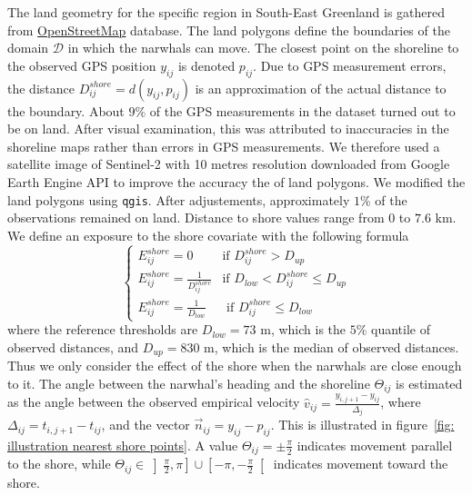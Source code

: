 \documentclass[11pt]{article}
\newcommand {\1}{\mathbb{1}}
\theoremstyle{definition}
\theoremstyle{remark}
\theoremstyle{remark}
\begin{document}
The land geometry for the specific region in South-East Greenland is gathered from \href{https://www.openstreetmap.org/#map=11/70.4029/-27.2928}{OpenStreetMap} database. The land polygons define the boundaries of the domain $\mathcal{D}$ in which the narwhals can move. The closest point on the shoreline to the observed GPS position $y_{ij}$  is denoted $p_{ij}$. Due to GPS measurement errors, the distance $D^{shore}_{ij}=d(y_{ij},p_{ij})$ is an approximation of the actual distance to the boundary. About $9\%$ of the GPS measurements in the dataset turned out to be on land. After visual examination, this was attributed to inaccuracies in the shoreline maps rather than errors in GPS measurements. We therefore used a satellite image of Sentinel-2 with 10 metres resolution downloaded from Google Earth Engine API to improve the accuracy the of land polygons. We modified  the land polygons using \texttt{qgis}. After adjustements,  approximately $1 \%$ of the observations remained on land. Distance to shore values range from $0$ to $7.6$ km. We define an exposure to the shore covariate with the following formula
\begin{equation}
	\left\{
	\begin{array}{ll}
		E^{shore}_{ij}=0 & \mbox{if } D^{shore}_{ij}>D_{up} \\
		E^{shore}_{ij}=\frac{1}{D^{shore}_{ij}} & \mbox{if } D_{low}<D^{shore}_{ij} \leq D_{up} \\
		E^{shore}_{ij}=\frac{1}{D_{low}} & \mbox{ if } D^{shore}_{ij} \leq D_{low}
	\end{array}
	\right.
	\label{eq: exp shore definition}
\end{equation}
where the reference thresholds are $D_{low}=73$ m, which is the $5\%$ quantile of observed distances, and $D_{up}=830$ m, which is the median of observed distances. Thus we only consider the effect of the shore when the narwhals are close enough to it. 
The angle between the narwhal's heading and the shoreline $\Theta_{ij}$ is estimated as the angle between the observed empirical velocity $\hat{v}_{ij}=\frac{y_{i,j+1}-y_{ij}}{\Delta_j}$, where $\Delta_{ij}=t_{i,j+1}-t_{ij}$, and the vector $\vec{n}_{ij}=y_{ij}-p_{ij}$. This is illustrated in figure~\ref{fig: illustration nearest shore points}. A value $\Theta_{ij}=\pm \frac{\pi}{2}$ indicates movement parallel to the shore, while $\Theta_{ij} \in \left]\frac{\pi}{2},\pi\right] \cup \left[-\pi,-\frac{\pi}{2}\right[$ indicates movement toward the shore. 
\end{document}
